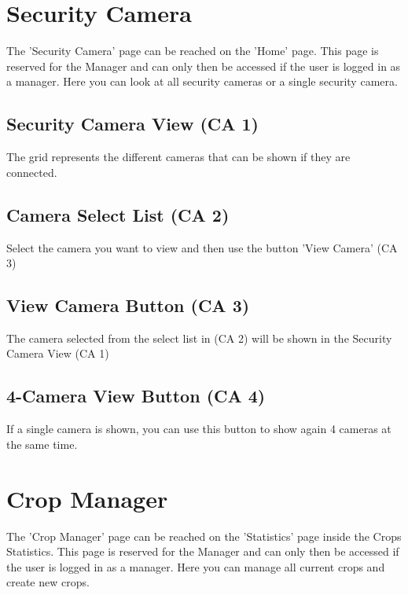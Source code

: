 \newpage
\section{Security Camera}
\label{sec:appendix_SecurityCamera}
\mbox{} \par
\noindent{}

The 'Security Camera' page can be reached on the 'Home' page. This page is
reserved for the Manager and can only then be accessed if the user is logged
in as a manager. Here you can look at all security cameras or a single security
camera.

\subsection{Security Camera View (CA 1)}
The grid represents the different cameras that can be shown if they are
connected.

\subsection{Camera Select List (CA 2)}
Select the camera you want to view and then use the button 'View Camera' (CA 3)

\subsection{View Camera Button (CA 3)}
The camera selected from the select list in (CA 2) will be shown in the Security
Camera View (CA 1)

\subsection{4-Camera View Button (CA 4)}
If a single camera is shown, you can use this button to show again 4 cameras at
the same time.



\newpage
\section{Crop Manager}
\label{sec:appendix_CropManager}
\mbox{} \par
\noindent{}

The 'Crop Manager' page can be reached on the 'Statistics' page inside the
Crops Statistics. This page is reserved for the Manager and can only then be
accessed if the user is logged in as a manager. Here you can manage all current
crops and create new crops.

